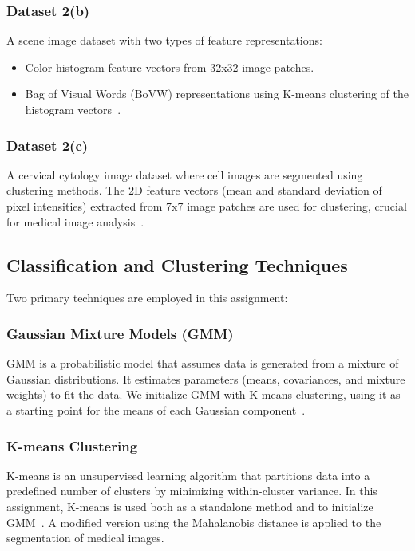 \documentclass[conference]{IEEEtran}
\begin{document}
	\subsubsection{Dataset 2(b)}
	A scene image dataset with two types of feature representations:
	\begin{itemize}
		\item Color histogram feature vectors from 32x32 image patches.
		\item Bag of Visual Words (BoVW) representations using K-means clustering of the histogram vectors~\cite{hastie2009elements}.
	\end{itemize}
	
	\subsubsection{Dataset 2(c)}
	A cervical cytology image dataset where cell images are segmented using clustering methods. The 2D feature vectors (mean and standard deviation of pixel intensities) extracted from 7x7 image patches are used for clustering, crucial for medical image analysis~\cite{bishop2006pattern}.
	
	\subsection{Classification and Clustering Techniques}
	
	Two primary techniques are employed in this assignment:
	
	\subsubsection{Gaussian Mixture Models (GMM)}
	GMM is a probabilistic model that assumes data is generated from a mixture of Gaussian distributions. It estimates parameters (means, covariances, and mixture weights) to fit the data. We initialize GMM with K-means clustering, using it as a starting point for the means of each Gaussian component~\cite{bishop2006pattern}.
	
	\subsubsection{K-means Clustering}
	K-means is an unsupervised learning algorithm that partitions data into a predefined number of clusters by minimizing within-cluster variance. In this assignment, K-means is used both as a standalone method and to initialize GMM~\cite{duda2000pattern}. A modified version using the Mahalanobis distance is applied to the segmentation of medical images.
	
\end{document}
